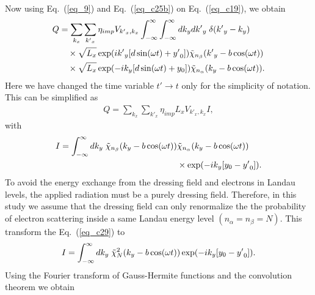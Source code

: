 Now using Eq.~(\ref{eq_9}) and Eq.~(\ref{eq_c25b}) on Eq.~(\ref{eq_c19}), we obtain
\begin{equation} \label{eq_c27}
  \begin{aligned}
    Q & =
    \sum_{k_x}\sum_{{k'}_x}
    {\eta_{imp} V_{{k'}_x,k_x}}
    \int_{-\infty}^{\infty} \int_{-\infty}^{\infty} dk_y d{k'}_y \;
    \delta({k'}_y - k_y)
    \\
    & \quad\times
    \sqrt{L_x}
    \exp(
      i{k'}_y  \qty[d\sin(\omega t) + {y'}_0]
    )
    \tilde{\chi}_{n_{\beta}}\qty({k'}_y -b\cos(\omega t))
    \\
    & \quad\times
    \sqrt{L_x}
    \exp(
      -ik_y  \qty[d\sin(\omega t) + y_0]
    )
    \tilde{\chi}_{n_{\alpha}}\qty(k_y -b\cos(\omega t)).
  \end{aligned}
\end{equation}
Here we have changed the time variable $t' \rightarrow t$ only for the simplicity of notation. This can be simplified as
\begin{equation} \label{eq_c28}
  \begin{aligned}
    Q =
    \sum_{k_x}\sum_{{k'}_x}
    {\eta_{imp} L_x V_{{k'}_x,k_x}} I,
  \end{aligned}
\end{equation}
with
\begin{equation} \label{eq_c29}
  \begin{aligned}
    I =
    \int_{-\infty}^{\infty} dk_y \;
    \tilde{\chi}_{n_{\beta}}\qty(k_y -b\cos(\omega t)) &
    \tilde{\chi}_{n_{\alpha}}\qty(k_y -b\cos(\omega t)) \\
    & \times
    \exp(
      -ik_y  \qty[y_0 - {y'}_0  ]
    ).
  \end{aligned}
\end{equation}
To avoid the energy exchange from the dressing field and electrons in Landau levels, the applied radiation must be a purely dressing field.
Therefore, in this study we assume that the dressing field can only renormalize the the probability of electron scattering inside a same Landau energy level $(n_{\alpha} = n_{\beta} =N)$. This transform the Eq.~(\ref{eq_c29}) to
\begin{equation} \label{eq_c30}
    I =
    \int_{-\infty}^{\infty} dk_y \;
    \tilde{\chi}_{N}^2 \qty(k_y -b\cos(\omega t))
    \exp(
      -ik_y  \qty[y_0 - {y'}_0  ]
    ).
\end{equation}
Using the Fourier transform of Gauss-Hermite functions \cite{celeghini21} and the convolution theorem \cite{arfken85,bracewell78} we obtain

